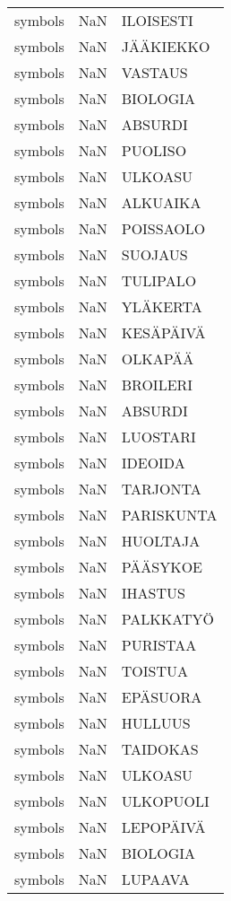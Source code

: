 \begin{tabular}{lll}
 symbols &  NaN &       ILOISESTI \\
 symbols &  NaN &       JÄÄKIEKKO \\
 symbols &  NaN &         VASTAUS \\
 symbols &  NaN &        BIOLOGIA \\
 symbols &  NaN &         ABSURDI \\
 symbols &  NaN &         PUOLISO \\
 symbols &  NaN &         ULKOASU \\
 symbols &  NaN &        ALKUAIKA \\
 symbols &  NaN &       POISSAOLO \\
 symbols &  NaN &         SUOJAUS \\
 symbols &  NaN &        TULIPALO \\
 symbols &  NaN &        YLÄKERTA \\
 symbols &  NaN &       KESÄPÄIVÄ \\
 symbols &  NaN &         OLKAPÄÄ \\
 symbols &  NaN &        BROILERI \\
 symbols &  NaN &         ABSURDI \\
 symbols &  NaN &        LUOSTARI \\
 symbols &  NaN &         IDEOIDA \\
 symbols &  NaN &        TARJONTA \\
 symbols &  NaN &      PARISKUNTA \\
 symbols &  NaN &        HUOLTAJA \\
 symbols &  NaN &        PÄÄSYKOE \\
 symbols &  NaN &         IHASTUS \\
 symbols &  NaN &       PALKKATYÖ \\
 symbols &  NaN &        PURISTAA \\
 symbols &  NaN &         TOISTUA \\
 symbols &  NaN &        EPÄSUORA \\
 symbols &  NaN &         HULLUUS \\
 symbols &  NaN &        TAIDOKAS \\
 symbols &  NaN &         ULKOASU \\
 symbols &  NaN &       ULKOPUOLI \\
 symbols &  NaN &       LEPOPÄIVÄ \\
 symbols &  NaN &        BIOLOGIA \\
 symbols &  NaN &         LUPAAVA \\

\end{tabular}
